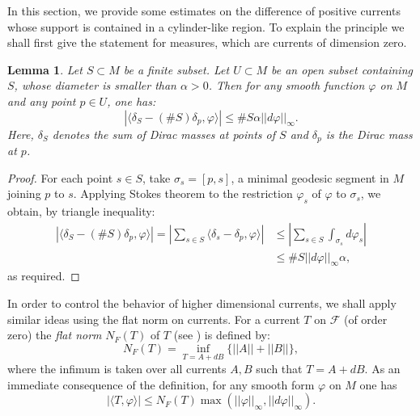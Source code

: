 \documentclass[12pt]{amsbook}%
\newtheorem{lem}[thm]{Lemma}
\theoremstyle{definition}
\theoremstyle{remark}
\numberwithin{section}{chapter}
\numberwithin{subsection}{section}
\numberwithin{figure}{chapter}
\begin{document}
{{%

In this section, we provide some estimates on the difference of positive currents whose support is contained in a cylinder-like region. 
To explain the principle we shall first give the statement for measures, which are currents of dimension zero. 

\begin{lem} Let $S\subset M$ be a finite subset.
Let $U \subset M$ be an open subset containing $S$, whose diameter is smaller than $\alpha >0$. Then for any smooth function $\varphi$ on $M$ and any point $p\in U$, one has: 
\begin{equation}
|\langle \delta_S -  (\#S)\delta_p, \varphi \rangle | \leqslant \# S\alpha   ||d\varphi||_\infty.
\end{equation}
Here, $\delta_S$ denotes the sum of Dirac masses at points of $S$ and $\delta_p$ is the Dirac mass at $p$. 
\end{lem}

\begin{proof}
For each point $s\in S$, take $\sigma_s = [p,s]$, a minimal geodesic segment in $M$ joining $p$ to $s$. 
Applying Stokes theorem to the restriction 
$\varphi_s$ of $\varphi$ to $\sigma_s$, we obtain, by triangle inequality:
\begin{align*}
|\langle \delta_S -  (\#S)\delta_p ,\varphi \rangle | = 
| \sum_{s \in S} \langle \delta_s - \delta_p, \varphi \rangle| &\leqslant \left | \sum_{s \in S} \int_{\sigma_s} d \varphi_s \right | \\
 & \leqslant  \# S ||d\varphi||_\infty \alpha, 
\end{align*}
as required.
\end{proof}

In order to control the behavior of higher dimensional currents, we shall apply similar ideas using the flat norm on currents. For a current $T$ on $\mathcal{F}$ (of order zero) the {\em flat norm} $N_F(T)$ of $T$ (see \cite[p. 41]{morgan}) is defined by: 
\begin{equation} \label{eq_def_flat_norm}
N_F(T) = \inf_{T = A + d B}  \{ ||A|| + ||B|| \}, 
\end{equation}
where the infimum is taken over all currents $A, B$ such that $T = A + d B$. 
As an immediate consequence of the definition,  
for any smooth form $\varphi$ on $M$ one has 
\begin{equation} \label{eq_apply_flat_norm}
|\langle T , \varphi\rangle| \leqslant  N_F(T) \max  (||\varphi||_\infty , ||d\varphi||_\infty ).  
\end{equation}

}}
\end{document}
